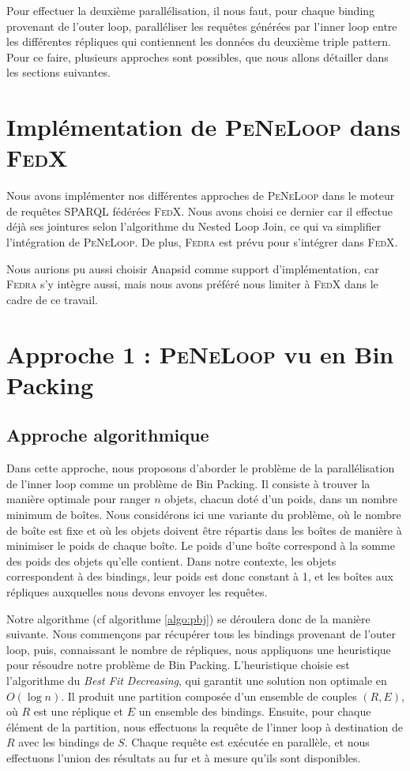 \documentclass[a4paper]{article}
\def\fedra{\textsc{Fedra}\xspace}
\def\fedx{\textsc{FedX}\xspace}
\def\peneloop{\textsc{PeNeLoop}\xspace}
\begin{document}
Pour effectuer la deuxième parallélisation, il nous faut, pour chaque binding provenant de l'outer loop, paralléliser les requêtes générées par l'inner loop entre les différentes répliques qui contiennent les données du deuxième triple pattern. Pour ce faire, plusieurs approches sont possibles, que nous allons détailler dans les sections suivantes.

\section{Implémentation de \peneloop dans \fedx}

Nous avons implémenter nos différentes approches de \peneloop dans le moteur de requêtes SPARQL fédérées \fedx. Nous avons choisi ce dernier car il effectue déjà ses jointures selon l'algorithme du Nested Loop Join, ce qui va simplifier l'intégration de \peneloop. De plus, \fedra est prévu pour s'intégrer dans \fedx.

Nous aurions pu aussi choisir Anapsid \cite{acosta2011anapsid} comme support d'implémentation, car \fedra s'y intègre aussi, mais nous avons préféré nous limiter à \fedx dans le cadre de ce travail.

\section{Approche 1 : \peneloop vu en Bin Packing}

\subsection{Approche algorithmique}

Dans cette approche, nous proposons d'aborder le problème de la parallélisation de l'inner loop comme un problème de Bin Packing. Il consiste à trouver la manière optimale pour ranger $n$ objets, chacun doté d'un poids, dans un nombre minimum de boîtes. Nous considérons ici une variante du problème, où le nombre de boîte est fixe et où les objets doivent être répartis dans les boîtes de manière à minimiser le poids de chaque boîte. Le poids d'une boîte correspond à la somme des poids des objets qu'elle contient. Dans notre contexte, les objets correspondent à des bindings, leur poids est donc constant à 1, et les boîtes aux répliques auxquelles nous devons envoyer les requêtes.

Notre algorithme (cf algorithme \ref{algo:pbj}) se déroulera donc de la manière suivante. Nous commençons par récupérer tous les bindings provenant de l'outer loop, puis, connaissant le nombre de répliques, nous appliquons une heuristique pour résoudre notre problème de Bin Packing. L'heuristique choisie est l'algorithme du \textit{Best Fit Decreasing}, qui garantit une solution non optimale en $O(\log n)$. Il produit une partition composée d'un ensemble de couples $(R, E)$, où $R$ est une réplique et $E$ un ensemble des bindings. Ensuite, pour chaque élément de la partition, nous effectuons la requête de l'inner loop à destination de $R$ avec les bindings de $S$. Chaque requête est exécutée en parallèle, et nous effectuons l'union des résultats au fur et à mesure qu'ils sont disponibles.
\end{document}
